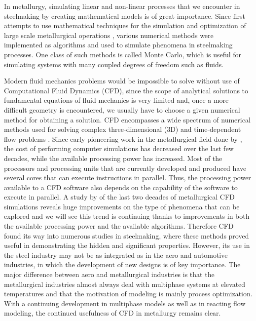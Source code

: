 In metallurgy, simulating linear and non-linear processes that we encounter in steelmaking by creating mathematical models is of great importance. Since first attempts to use mathematical techniques for the simulation and optimization of large scale metallurgical operations \citep{Ray1973}, various numerical methods were implemented as algorithms and used to simulate phenomena in steelmaking processes. One class of such methods is called Monte Carlo, which is useful for simulating systems with many coupled degrees of freedom such as fluids.

Modern fluid mechanics problems would be impossible to solve without use of Computational Fluid Dynamics (CFD), since the scope of analytical solutions to fundamental equations of fluid mechanics is very limited and, once a more difficult geometry is encountered, we usually have to choose a given numerical method
for obtaining a solution. CFD encompasses a wide spectrum of numerical methods used for solving complex three-dimensional (3D) and time-dependent flow problems \citep{RAPP20173}. Since early pioneering work in the metallurgical field done by \citet{Szekely1977}, the cost of performing computer simulations has decreased over the last few decades, while the available processing power has increased. Most of the processors and  processing units that are currently developed and produced have several cores that can execute instructions in parallel. Thus, the processing power available to a CFD software also depends on the capability of the software to execute in parallel. A study by \citet{Ersson2018} of the last two decades of metallurgical CFD simulations reveals huge improvements on the type of phenomena that can be explored and we will see this trend is continuing thanks to improvements in both the available processing power and the available algorithms. Therefore CFD found its way into numerous studies in steelmaking, where these methods proved useful in demonstrating the hidden and significant properties. However, its use in the steel industry may not be as integrated as in the aero and automotive industries, in which the development of new designs is of key importance. The major difference between aero and metallurgical industries is that the metallurgical industries almost always deal with multiphase systems at elevated temperatures and that the motivation of modeling is mainly process optimization. With a continuing development in multiphase models as well as in reacting flow modeling, the continued usefulness of CFD in metallurgy remains clear.


